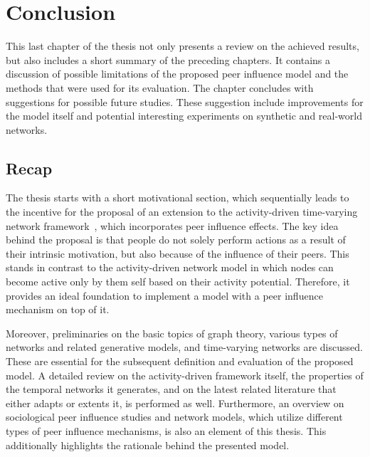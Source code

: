 \chapter{Conclusion}
\label{cha:conclusion}

This last chapter of the thesis not only presents a review on the achieved results, but also includes a short summary of the preceding chapters.
It contains a discussion of possible limitations of the proposed peer influence model and the methods that were used for its evaluation.
The chapter concludes with suggestions for possible future studies.
These suggestion include improvements for the model itself and potential interesting experiments on synthetic and real-world networks.




\section{Recap}
\label{sec:recap}

The thesis starts with a short motivational section, which sequentially leads to the incentive for the proposal of an extension to the activity-driven time-varying network framework~\cite{Perra2012a}, which incorporates peer influence effects.
The key idea behind the proposal is that people do not solely perform actions as a result of their intrinsic motivation, but also because of the influence of their peers.
This stands in contrast to the activity-driven network model in which nodes can become active only by them self based on their activity potential.
Therefore, it provides an ideal foundation to implement a model with a peer influence mechanism on top of it.

Moreover, preliminaries on the basic topics of graph theory, various types of networks and related generative models, and time-varying networks are discussed.
These are essential for the subsequent definition and evaluation of the proposed model.
A detailed review on the activity-driven framework itself, the properties of the temporal networks it generates, and on the latest related literature that either adapts or extents it, is performed as well.
Furthermore, an overview on sociological peer influence studies and network models, which utilize different types of peer influence mechanisms, is also an element of this thesis.
This additionally highlights the rationale behind the presented model.

